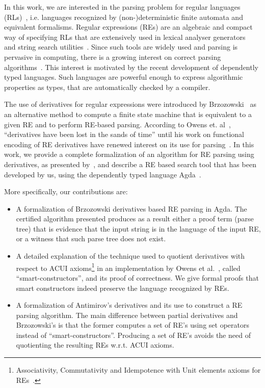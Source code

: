 \documentclass[review]{elsarticle}
\begin{document}
In this work, we are interested in the parsing problem for regular
languages (RLs)~\cite{Hopcroft2000}, i.e. languages recognized by
(non-)deterministic finite automata and equivalent formalisms. Regular
expressions (REs) are an algebraic and compact way of specifying RLs
that are extensively used in lexical analyser
generators~\cite{Lesk1990} and string search utilities~\cite{Grep}.
Since such tools are widely used and parsing is pervasive in
computing, there is a growing interest on correct parsing
algorithms~\cite{FirsovU13,FirsovU14,Danielsson2010}.  This interest
is motivated by the recent development of dependently typed
languages. Such languages are powerful enough to express algorithmic
properties as types, that are automatically checked by a compiler.

The use of derivatives for regular expressions were introduced by
Brzozowski~\cite{Brzozowski1964} as an alternative method to compute a
finite state machine that is equivalent to a given RE and to perform
RE-based parsing. According to Owens et. al~\cite{Owens2009},
``derivatives have been lost in the sands of time'' until his work on
functional encoding of RE derivatives have renewed interest on its use
for parsing~\cite{Might2011,Fischer2010}.
In this work, we provide a complete formalization of an algorithm for
RE parsing using derivatives, as presented by~\cite{Owens2009}, and
describe a RE based search tool that has been developed by us, using
the dependently typed language Agda~\cite{Norell2009}.

More specifically, our contributions are:
\begin{itemize}
  \item A formalization of Brzozowski derivatives based RE
    parsing in Agda. The certified algorithm presented produces as
    a result either a proof term (parse tree) that is evidence that
    the input string is in the language of the input RE, or a witness
    that such parse tree does not exist.

  \item A detailed explanation of the technique used to quotient
    derivatives with respect to ACUI axioms\footnote{Associativity,
      Commutativity and Idempotence with Unit elements axioms for
      REs~\cite{Brzozowski1964}.} in an implementation by Owens et
    al.~\cite{Owens2009}, called ``smart-constructors'', and its proof
    of correctness. We give formal proofs that smart constructors
    indeed preserve the language recognized by REs.

  \item A formalization of Antimirov's derivatives and its use to
      construct a RE parsing algorithm. The main difference between
      partial derivatives and Brzozowski's is that the former computes
      a set of RE's using set operators instead of ``smart-constructors''.
      Producing a set of RE's avoids the need of quotienting the resulting
      REs w.r.t. ACUI axioms.  
\end{itemize}
\end{document}
